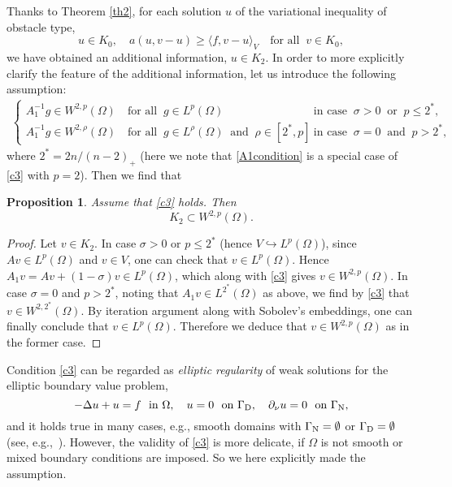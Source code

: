 \documentclass[reqno,10pt]{amsart}
\newtheorem{Prop}[Th]{Proposition}
\begin{document}
Thanks to Theorem \ref{th2}, for each solution $u$ of the variational
inequality of obstacle type,
\begin{equation}\label{vi}
u \in K_0, \quad a(u, v - u) \geq \langle f, v - u \rangle_V \quad 
\mbox{for all } \ v \in K_0,
\end{equation}
we have obtained an additional information, $u \in K_2$. In order to
more explicitly clarify the feature of the additional information,
let us introduce the following assumption: 
\begin{align}\label{c3}
\begin{cases}
 A_1^{-1}g\in W^{2,p}(\Omega)\quad \mbox{for all } \ g\in L^p(\Omega) 
 &\mbox{ in case } \ \sigma > 0 \ \mbox{ or } \ p \leq 2^*,\\
 A_1^{-1}g\in W^{2,\rho}(\Omega)\quad \mbox{for all } \ g\in L^\rho(\Omega)
 \ \mbox{ and } \ \rho \in [2^*,p]
 &\mbox{ in case } \ \sigma = 0 \ \mbox{ and } \ p > 2^*,
\end{cases}
\end{align}
where $2^* = 2n/(n-2)_+$ (here we note that
\eqref{A1condition} is a special case of \eqref{c3} with $p = 2$).
Then we find that
\begin{Prop}\label{P:K2}
Assume that \eqref{c3} holds. Then
$$
K_2 \subset W^{2,p}(\Omega).
$$
\end{Prop}

\begin{proof}
Let $v \in K_2$.
In case $\sigma > 0$ or $p \leq 2^*$ (hence $V \hookrightarrow
 L^p(\Omega)$), since $Av \in L^p(\Omega)$ and $v \in V$, one can check
 that $v \in L^p(\Omega)$. Hence $A_1 v = A v + (1 - \sigma) v \in
 L^p(\Omega)$, which along with \eqref{c3} gives $v \in W^{2,p}(\Omega)$.
In case $\sigma = 0$ and $p > 2^*$, noting that $A_1 v \in
 L^{2^*}(\Omega)$ as above, we find by \eqref{c3} that $v \in
 W^{2,2^*}(\Omega)$. By iteration argument along with Sobolev's
 embeddings, one can finally conclude that $v \in
 L^p(\Omega)$. Therefore we deduce that $v \in W^{2,p}(\Omega)$ as in
 the former case.
\end{proof}

Condition \eqref{c3} can be regarded as \emph{elliptic regularity} of
 weak solutions for the elliptic boundary value problem,
$$
-\Delta u + u=f \ \mbox{ in } \Omega, \quad
u=0 \ \mbox{ on } {{\Gamma_{\rm\scriptsize D}}},\quad
\partial_\nu u = 0 \ \mbox{ on } {{\Gamma_{\rm\scriptsize N}}},
$$
and it holds true in many cases, e.g., smooth domains with ${{\Gamma_{\rm\scriptsize N}}} =
 \emptyset$ or ${{\Gamma_{\rm\scriptsize D}}} = \emptyset$ (see, e.g.,~\cite{G-T83}). However,
 the validity of \eqref{c3} is more delicate, if $\Omega$ is not smooth
 or mixed boundary conditions are imposed. So we here explicitly made the
 assumption.
 
\end{document}
